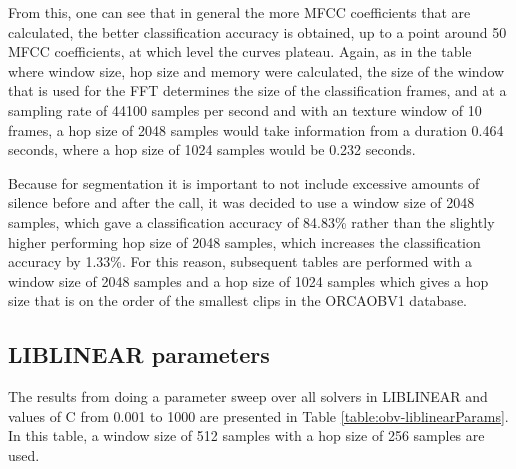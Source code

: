 \documentclass[12pt,oneside]{book}
\begin{document}
From this, one can see that in general the more MFCC coefficients that
are calculated, the better classification accuracy is obtained, up to
a point around 50 MFCC coefficients, at which level the curves
plateau.  Again, as in the table where window size, hop size and
memory were calculated, the size of the window that is used for the
FFT determines the size of the classification frames, and at a
sampling rate of 44100 samples per second and with an texture window
of 10 frames, a hop size of 2048 samples would take information from a
duration 0.464 seconds, where a hop size of 1024 samples would be
0.232 seconds.

Because for segmentation it is important to not include excessive
amounts of silence before and after the call, it was decided to use a
window size of 2048 samples, which gave a classification accuracy of
84.83\% rather than the slightly higher performing hop size of 2048
samples, which increases the classification accuracy by 1.33\%.  For
this reason, subsequent tables are performed with a window size of
2048 samples and a hop size of 1024 samples which gives a hop size
that is on the order of the smallest clips in the ORCAOBV1 database.


%
%
\subsection{LIBLINEAR parameters}


The results from doing a parameter sweep over all solvers in LIBLINEAR
and values of C from 0.001 to 1000 are presented in Table
\ref{table:obv-liblinearParams}.  In this table, a window size of 512
samples with a hop size of 256 samples are used.
\end{document}
